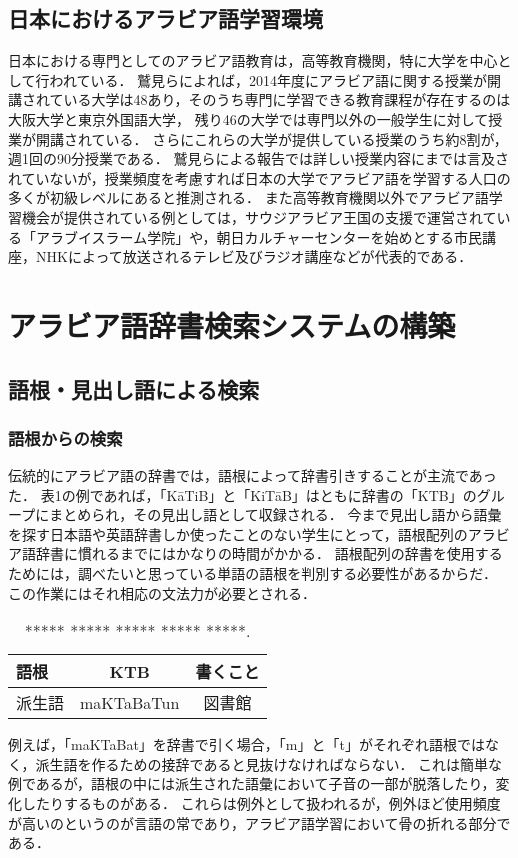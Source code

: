 \documentclass[technicalreport]{ieicej}
\begin{document}
\subsection{日本におけるアラビア語学習環境}
日本における専門としてのアラビア語教育は，高等教育機関，特に大学を中心として行われている．
鷲見らによれば，2014年度にアラビア語に関する授業が開講されている大学は48あり，そのうち専門に学習できる教育課程が存在するのは大阪大学と東京外国語大学， 残り46の大学では専門以外の一般学生に対して授業が開講されている．
さらにこれらの大学が提供している授業のうち約8割が，週1回の90分授業である．
鷲見らによる報告では詳しい授業内容にまでは言及されていないが，授業頻度を考慮すれば日本の大学でアラビア語を学習する人口の多くが初級レベルにあると推測される．
また高等教育機関以外でアラビア語学習機会が提供されている例としては，サウジアラビア王国の支援で運営されている「アラブイスラーム学院」や，朝日カルチャーセンターを始めとする市民講座，NHKによって放送されるテレビ及びラジオ講座などが代表的である．

\section{アラビア語辞書検索システムの構築}
\subsection{語根・見出し語による検索}
\subsubsection{語根からの検索}
伝統的にアラビア語の辞書では，語根によって辞書引きすることが主流であった．
表1の例であれば，「KāTiB」と「KiTāB」はともに辞書の「KTB」のグループにまとめられ，その見出し語として収録される．
今まで見出し語から語彙を探す日本語や英語辞書しか使ったことのない学生にとって，語根配列のアラビア語辞書に慣れるまでにはかなりの時間がかかる．
語根配列の辞書を使用するためには，調べたいと思っている単語の語根を判別する必要性があるからだ．
この作業にはそれ相応の文法力が必要とされる．

\begin{table}[ht]
\begin{center}
\begin{tabular}{l|cc}
   語根& KTB & 書くこと\\
  \hline
 派生語& maKTaBaTun & 図書館\\
\hline
\end{tabular}
\caption{***** ***** ***** ***** *****.}
\label{table:alignment}
\end{center}
\end{table}
例えば，「maKTaBat」を辞書で引く場合，「m」と「t」がそれぞれ語根ではなく，派生語を作るための接辞であると見抜けなければならない．
これは簡単な例であるが，語根の中には派生された語彙において子音の一部が脱落したり，変化したりするものがある．
これらは例外として扱われるが，例外ほど使用頻度が高いのというのが言語の常であり，アラビア語学習において骨の折れる部分である．
\end{document}

